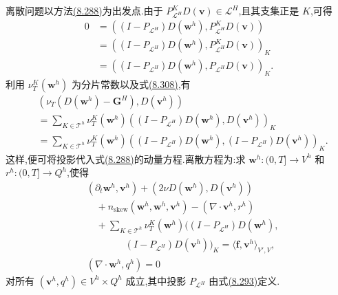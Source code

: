 \begin{note}[离散问题的表述]
\label{note:vms-coarse-projection-discrete-formulation}
离散问题以方法\hyperref[eq:vms-coarse-projection-three-scale-method]{(8.288)}为出发点.由于
$P_{\mathcal L^H}^KD(\bm v)\in\mathcal L^H$,且其支集正是 $K$,可得
\begin{equation}\label{eq:vms-coarse-projection-orthogonality-local}
\begin{aligned}
 0
 &=((I-P_{\mathcal L^H})D(\bm w^h),
      P_{\mathcal L^H}^KD(\bm v))\\
 &=((I-P_{\mathcal L^H})D(\bm w^h),
      P_{\mathcal L^H}^KD(\bm v))_K\\
 &=((I-P_{\mathcal L^H})D(\bm w^h),
      P_{\mathcal L^H}D(\bm v))_K.
\end{aligned}
\end{equation}
利用 $\nu_T^K(\bm w^h)$ 为分片常数以及式\hyperref[eq:vms-coarse-projection-orthogonality-local]{(8.308)},有
\[
\begin{aligned}
 &(\nu_T(D(\bm w^h)-\bm G^H),D(\bm v^h))\\
 &=\sum_{K\in\mathcal T^h}
   \nu_T^K(\bm w^h)
   ((I-P_{\mathcal L^H})D(\bm w^h),D(\bm v^h))_K\\
 &=\sum_{K\in\mathcal T^h}
   \nu_T^K(\bm w^h)
   ((I-P_{\mathcal L^H})D(\bm w^h),
      (I-P_{\mathcal L^H})D(\bm v^h))_K.
\end{aligned}
\]
这样,便可将投影代入式\hyperref[eq:vms-coarse-projection-three-scale-method]{(8.288)}的动量方程.离散方程为:求
$\bm w^h:(0,T]\to V^h$ 和 $r^h:(0,T]\to Q^h$,使得
\begin{equation}\label{eq:vms-coarse-projection-discrete-method}
\begin{aligned}
 &(\partial_t\bm w^h,\bm v^h)
 +(2\nu D(\bm w^h),D(\bm v^h))\\
 &\quad+n_{\mathrm{skew}}(\bm w^h,\bm w^h,\bm v^h)
 -(\nabla\cdot\bm v^h,r^h)\\
 &\quad+\sum_{K\in\mathcal T^h}
  \nu_T^K(\bm w^h)
  ((I-P_{\mathcal L^H})D(\bm w^h),\\
 &\qquad\qquad (I-P_{\mathcal L^H})D(\bm v^h))_K
 =\langle\bm f,\bm v^h\rangle_{V',V},\\
 &(\nabla\cdot\bm w^h,q^h)=0
\end{aligned}
\end{equation}
对所有 $(\bm v^h,q^h)\in V^h\times Q^h$ 成立,其中投影 $P_{\mathcal L^H}$ 由式\hyperref[eq:vms-coarse-projection-orthogonality]{(8.293)}定义.


\end{note}
